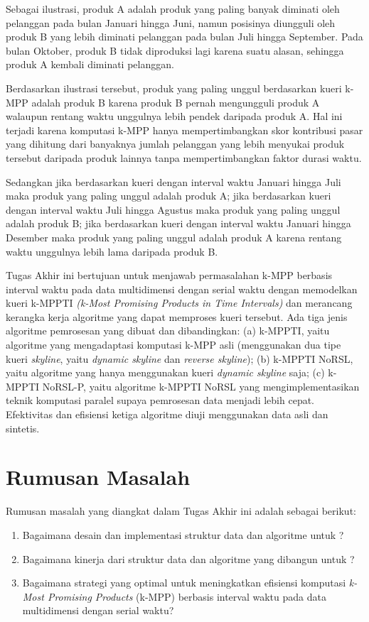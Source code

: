 Sebagai ilustrasi, produk A adalah produk yang paling banyak diminati oleh pelanggan pada bulan Januari hingga Juni, namun posisinya diungguli oleh produk B yang lebih diminati pelanggan pada bulan Juli hingga September. Pada bulan Oktober, produk B tidak diproduksi lagi karena suatu alasan, sehingga produk A kembali diminati pelanggan.  

Berdasarkan ilustrasi tersebut, produk yang paling unggul berdasarkan kueri k-MPP adalah produk B karena produk B pernah mengungguli produk A walaupun rentang waktu unggulnya lebih pendek daripada produk A. Hal ini terjadi karena komputasi k-MPP hanya mempertimbangkan skor kontribusi pasar yang dihitung dari banyaknya jumlah pelanggan yang lebih menyukai produk tersebut daripada produk lainnya tanpa mempertimbangkan faktor durasi waktu.

Sedangkan jika berdasarkan kueri dengan interval waktu Januari hingga Juli maka produk yang paling unggul adalah produk A; jika berdasarkan kueri dengan interval waktu Juli hingga Agustus maka produk yang paling unggul adalah produk B; jika berdasarkan kueri dengan interval waktu Januari hingga Desember maka produk yang paling unggul adalah produk A karena rentang waktu unggulnya lebih lama daripada produk B.

Tugas Akhir ini bertujuan untuk menjawab permasalahan k-MPP berbasis interval waktu pada data multidimensi dengan serial waktu dengan memodelkan kueri k-MPPTI \textit{(k-Most Promising Products in Time Intervals)} dan merancang kerangka kerja algoritme yang dapat memproses kueri tersebut. Ada tiga jenis algoritme pemrosesan yang dibuat dan dibandingkan: (a) k-MPPTI, yaitu algoritme yang mengadaptasi komputasi k-MPP asli (menggunakan dua tipe kueri \textit{skyline}, yaitu \textit{dynamic skyline} dan \textit{reverse skyline}); (b) k-MPPTI NoRSL, yaitu algoritme yang hanya menggunakan kueri \textit{dynamic skyline} saja; (c) k-MPPTI NoRSL-P, yaitu algoritme k-MPPTI NoRSL yang mengimplementasikan teknik komputasi paralel supaya pemrosesan data menjadi lebih cepat. Efektivitas dan efisiensi ketiga algoritme diuji menggunakan data asli dan sintetis.

\section{Rumusan Masalah}
\tab Rumusan masalah yang diangkat dalam Tugas Akhir ini adalah sebagai berikut:
\begin{enumerate}
	\item Bagaimana desain dan implementasi struktur data dan algoritme untuk \problemm?
	\item Bagaimana kinerja dari struktur data dan algoritme yang dibangun untuk \problemm?
	\item Bagaimana strategi yang optimal untuk meningkatkan efisiensi komputasi \textit{k-Most Promising Products} (k-MPP) berbasis interval waktu pada data multidimensi dengan serial waktu?
\end{enumerate}

